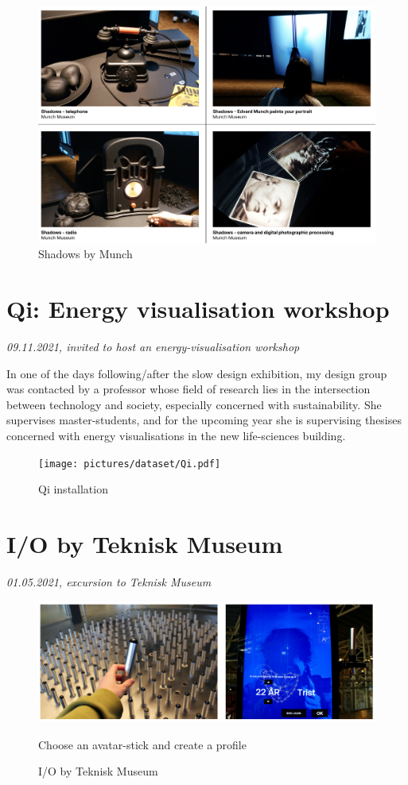 \begin{figure}[H]
\centering 
\includegraphics[width=12cm]{pictures/dataset/munch_1.png}
\caption{Shadows by Munch}
\end{figure}


\section{Qi: Energy visualisation workshop}
\emph{09.11.2021, invited to host an energy-visualisation workshop}

In one of the days following/after the slow design exhibition, my design group was contacted by a professor whose field of research lies in the intersection between technology and society, especially concerned with sustainability. She supervises master-students, and for the upcoming year she is supervising thesises concerned with energy visualisations in the new life-sciences building.

\begin{figure}[H]
\centering 
\texttt{[image: pictures/dataset/Qi.pdf]}
\caption{Qi installation}
\end{figure}


\section{I/O by Teknisk Museum}
\par
\emph{01.05.2021, excursion to Teknisk Museum}
\par

\autocite{tekniskmuseum_2022}

\begin{figure}[H]
\includegraphics[width=13cm]{pictures/process/tm_pinne.png}
\caption{I/O by Teknisk Museum}{Choose an avatar-stick and create a profile}
\centering 
\end{figure}

